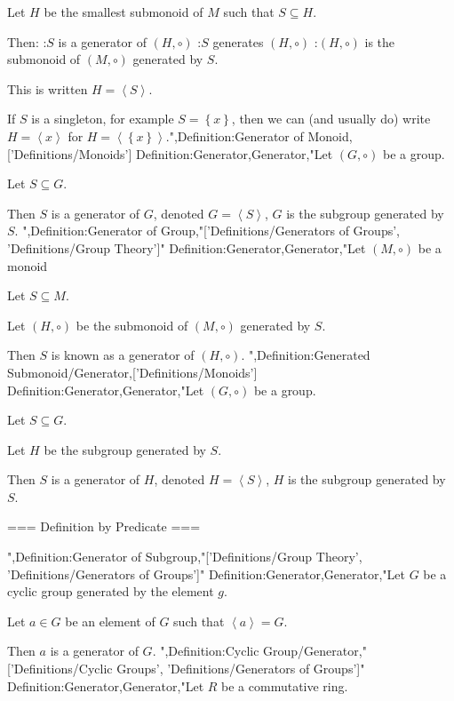 Let $H$ be the smallest submonoid of $M$ such that $S \subseteq H$.


Then:
:$S$ is a generator of $\left( H, \circ \right)$
:$S$ generates $\left( H, \circ \right)$
:$\left( H, \circ \right)$ is the submonoid of $\left( M, \circ \right)$ generated by $S$.


This is written $H = {\left\langle S \right\rangle}$.


If $S$ is a singleton, for example $S = \left\lbrace x \right\rbrace$, then we can (and usually do) write $H = {\left\langle x \right\rangle}$ for $H = {\left\langle \left\lbrace x \right\rbrace \right\rangle}$.",Definition:Generator of Monoid,['Definitions/Monoids']
Definition:Generator,Generator,"Let $\left( G, \circ \right)$ be a group.

Let $S \subseteq G$.


Then $S$ is a generator of $G$, denoted $G = {\left\langle S \right\rangle}$,  $G$ is the subgroup generated by $S$.
",Definition:Generator of Group,"['Definitions/Generators of Groups', 'Definitions/Group Theory']"
Definition:Generator,Generator,"Let $\left( M, \circ \right)$ be a monoid

Let $S \subseteq M$.

Let $\left( H, \circ \right)$ be the submonoid of $\left( M, \circ \right)$ generated by $S$.

Then $S$ is known as a generator of $\left( H, \circ \right)$.
",Definition:Generated Submonoid/Generator,['Definitions/Monoids']
Definition:Generator,Generator,"Let $\left( G, \circ \right)$ be a group.

Let $S \subseteq G$.

Let $H$ be the subgroup generated by $S$.


Then $S$ is a generator of $H$, denoted $H = {\left\langle S \right\rangle}$,  $H$ is the subgroup generated by $S$.


=== Definition by Predicate ===

",Definition:Generator of Subgroup,"['Definitions/Group Theory', 'Definitions/Generators of Groups']"
Definition:Generator,Generator,"Let $G$ be a cyclic group generated by the element $g$.

Let $a \in G$ be an element of $G$ such that ${\left\langle a \right\rangle} = G$.

Then $a$ is a generator of $G$.
",Definition:Cyclic Group/Generator,"['Definitions/Cyclic Groups', 'Definitions/Generators of Groups']"
Definition:Generator,Generator,"Let $R$ be a commutative ring. 

